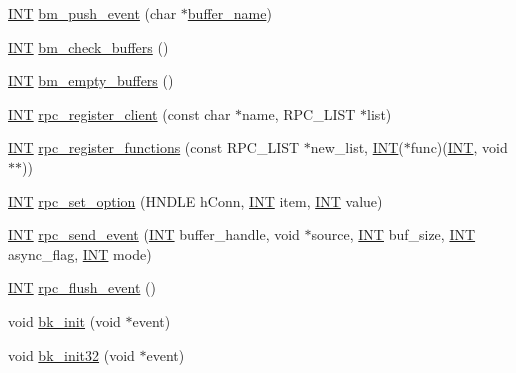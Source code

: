 \begin{DoxyCompactItemize}
\item 
\hyperlink{vppg_8h_a392e62da233ed3e2f7c3fd4f487a3896}{INT} \hyperlink{group__bmfunctionc_gabcc6bb732b720fcc3ffe859f732a07e0}{bm\_\-push\_\-event} (char $\ast$\hyperlink{mevb_8c_a93bc09c1f5f9f26a081d11962971f301}{buffer\_\-name})
\item 
\hyperlink{vppg_8h_a392e62da233ed3e2f7c3fd4f487a3896}{INT} \hyperlink{group__bmfunctionc_ga6f72d4840fd9ca14a9864252fe5d8b3a}{bm\_\-check\_\-buffers} ()
\item 
\hyperlink{vppg_8h_a392e62da233ed3e2f7c3fd4f487a3896}{INT} \hyperlink{group__bmfunctionc_ga516c50d818df89f466ac1fc135120fa6}{bm\_\-empty\_\-buffers} ()
\item 
\hyperlink{vppg_8h_a392e62da233ed3e2f7c3fd4f487a3896}{INT} \hyperlink{group__rpcfunctionc_ga86593a38d88520b4cef9644b7fdc6d23}{rpc\_\-register\_\-client} (const char $\ast$name, RPC\_\-LIST $\ast$list)
\item 
\hyperlink{vppg_8h_a392e62da233ed3e2f7c3fd4f487a3896}{INT} \hyperlink{group__rpcfunctionc_ga8503759d27477f8dd4558864dde5a687}{rpc\_\-register\_\-functions} (const RPC\_\-LIST $\ast$new\_\-list, \hyperlink{vppg_8h_a392e62da233ed3e2f7c3fd4f487a3896}{INT}($\ast$func)(\hyperlink{vppg_8h_a392e62da233ed3e2f7c3fd4f487a3896}{INT}, void $\ast$$\ast$))
\item 
\hyperlink{vppg_8h_a392e62da233ed3e2f7c3fd4f487a3896}{INT} \hyperlink{group__rpcfunctionc_gaab360e4fd185439b0913c723581115ea}{rpc\_\-set\_\-option} (HNDLE hConn, \hyperlink{vppg_8h_a392e62da233ed3e2f7c3fd4f487a3896}{INT} item, \hyperlink{vppg_8h_a392e62da233ed3e2f7c3fd4f487a3896}{INT} value)
\item 
\hyperlink{vppg_8h_a392e62da233ed3e2f7c3fd4f487a3896}{INT} \hyperlink{group__rpcfunctionc_ga3191feb350dfa7289e8c7cf2f5993222}{rpc\_\-send\_\-event} (\hyperlink{vppg_8h_a392e62da233ed3e2f7c3fd4f487a3896}{INT} buffer\_\-handle, void $\ast$source, \hyperlink{vppg_8h_a392e62da233ed3e2f7c3fd4f487a3896}{INT} buf\_\-size, \hyperlink{vppg_8h_a392e62da233ed3e2f7c3fd4f487a3896}{INT} async\_\-flag, \hyperlink{vppg_8h_a392e62da233ed3e2f7c3fd4f487a3896}{INT} mode)
\item 
\hyperlink{vppg_8h_a392e62da233ed3e2f7c3fd4f487a3896}{INT} \hyperlink{group__rpcfunctionc_ga83d80e4f1e8d2a2d7f38e58dcfd3c711}{rpc\_\-flush\_\-event} ()
\item 
void \hyperlink{group__bkfunctionc_gac6fadde40824dbf7bd70abedd29be2bd}{bk\_\-init} (void $\ast$event)
\item 
void \hyperlink{group__bkfunctionc_gae7cbf587db63fcdf66dd18b29f08b6d2}{bk\_\-init32} (void $\ast$event)
$$
\end{DoxyCompactItemize}
